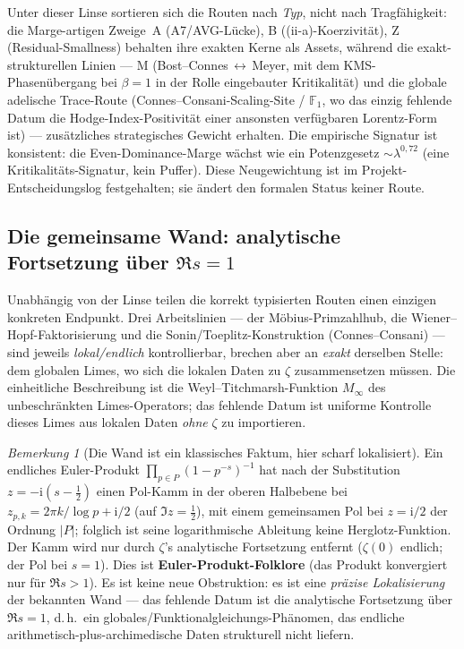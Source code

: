 \documentclass[12pt,a4paper]{article}
\theoremstyle{definition}
\theoremstyle{remark}
\newtheorem{remark}[theorem]{Bemerkung}
\begin{document}
Unter dieser Linse sortieren sich die Routen nach \emph{Typ}, nicht nach
Tragfähigkeit: die Marge-artigen Zweige~A (A7/AVG-Lücke), B ((ii-a)-Koerzivität), Z
(Residual-Smallness) behalten ihre exakten Kerne als Assets, während die
exakt-strukturellen Linien --- M (Bost--Connes\,$\leftrightarrow$\,Meyer, mit dem
KMS-Phasenübergang bei $\beta=1$ in der Rolle eingebauter Kritikalität) und die
globale adelische Trace-Route (Connes--Consani-Scaling-Site / $\mathbb{F}_1$, wo das
einzig fehlende Datum die Hodge-Index-Positivität einer ansonsten verfügbaren
Lorentz-Form ist) --- zusätzliches strategisches Gewicht erhalten. Die empirische
Signatur ist konsistent: die Even-Dominance-Marge wächst wie ein Potenzgesetz
$\sim\lambda^{0{,}72}$ (eine Kritikalitäts-Signatur, kein Puffer). Diese
Neugewichtung ist im Projekt-Entscheidungslog festgehalten; sie ändert den formalen
Status keiner Route.

\subsection{Die gemeinsame Wand: analytische Fortsetzung über $\Re s=1$}
\label{sec:common-wall-ac}

Unabhängig von der Linse teilen die korrekt typisierten Routen einen einzigen
konkreten Endpunkt. Drei Arbeitslinien --- der Möbius-Primzahlhub, die
Wiener--Hopf-Faktorisierung und die Sonin/Toeplitz-Konstruktion (Connes--Consani)
--- sind jeweils \emph{lokal/endlich} kontrollierbar, brechen aber an \emph{exakt}
derselben Stelle: dem globalen Limes, wo sich die lokalen Daten zu $\zeta$
zusammensetzen müssen. Die einheitliche Beschreibung ist die
Weyl--Titchmarsh-Funktion $M_\infty$ des unbeschränkten Limes-Operators; das
fehlende Datum ist uniforme Kontrolle dieses Limes aus lokalen Daten \emph{ohne}
$\zeta$ zu importieren.

\begin{remark}[Die Wand ist ein klassisches Faktum, hier scharf lokalisiert]
\label{rem:wall-folklore}
Ein endliches Euler-Produkt $\prod_{p\in P}(1-p^{-s})^{-1}$ hat nach der Substitution
$z=-\mathrm{i}(s-\tfrac12)$ einen Pol-Kamm in der oberen Halbebene bei
$z_{p,k}=2\pi k/\log p+\mathrm{i}/2$ (auf $\Im z=\tfrac12$), mit einem gemeinsamen Pol
bei $z=\mathrm{i}/2$ der Ordnung $|P|$; folglich ist seine logarithmische Ableitung
keine Herglotz-Funktion. Der Kamm wird nur durch $\zeta$'s analytische Fortsetzung
entfernt ($\zeta(0)$ endlich; der Pol bei $s=1$). Dies ist
\textbf{Euler-Produkt-Folklore} (das Produkt konvergiert nur für $\Re s>1$). Es ist
keine neue Obstruktion: es ist eine \emph{präzise Lokalisierung} der bekannten Wand
--- das fehlende Datum ist die analytische Fortsetzung über $\Re s=1$, d.\,h.\ ein
globales/Funktionalgleichungs-Phänomen, das endliche arithmetisch-plus-archimedische
Daten strukturell nicht liefern.
\end{remark}
\end{document}
